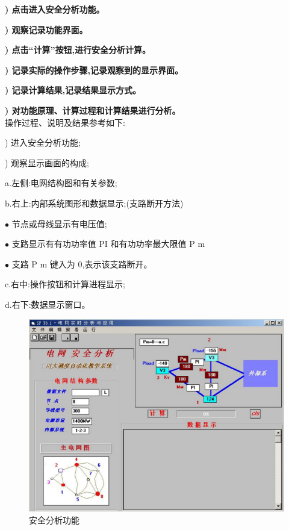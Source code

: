 \documentclass[a4paper]{ctexrep}
\begin{document}
                    \textbf{) 点击进入安全分析功能。}

                    \textbf{) 观察记录功能界面。}

                    \textbf{) 点击“计算”按钮,进行安全分析计算。}

                    \textbf{) 记录实际的操作步骤,记录观察到的显示界面。}

                    \textbf{) 记录计算结果,记录结果显示方式。}

                    \textbf{) 对功能原理、计算过程和计算结果进行分析。} \\

                    操作过程、说明及结果参考如下:

                    ) 进入安全分析功能;

                    ) 观察显示画面的构成;

                    \qquad a.左侧:电网结构图和有关参数;

                    \qquad b.右上:内部系统图形和数据显示;\quad (支路断开方法)

                    \qquad \quad $\bullet$ \quad 节点或母线显示有电压值;

                    \qquad \quad $\bullet$ \quad 支路显示有有功功率值 PI 和有功功率最大限值 P m

                    \qquad \quad $\bullet$ \quad 支路 P m 键入为 0,表示该支路断开。

                    \qquad c.右中:操作按钮和计算进程显示;

                    \qquad d.右下:数据显示窗口。

                    \begin{figure}[htbp]
                        \centering
                        \includegraphics[width=12cm]{6.pdf}
                        \caption{安全分析功能}
                    \end{figure}
\end{document}
